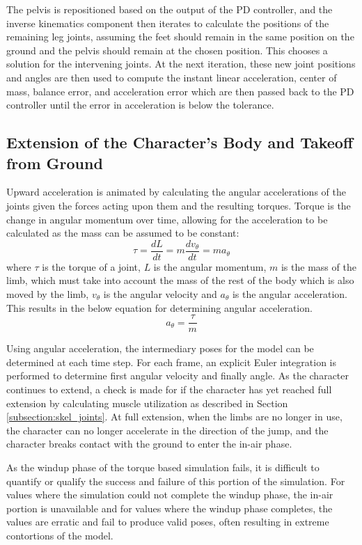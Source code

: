The pelvis is repositioned based on the output of the PD controller, and the inverse kinematics component then iterates to calculate the positions of the remaining leg joints, assuming the feet should remain in the same position on the ground and the pelvis should remain at the chosen position.  This chooses a solution for the intervening joints.  At the next iteration, these new joint positions and angles are then used to compute the instant linear acceleration, center of mass, balance error, and acceleration error which are then passed back to the PD controller until the error in acceleration is below the tolerance.


\subsection{Extension of the Character's Body and Takeoff from Ground}
\label{subsection:thrust}
Upward acceleration is animated by calculating the angular accelerations of the joints given the forces acting upon them and the resulting torques.  Torque is the change in angular momentum over time, allowing for the acceleration to be calculated as the mass can be assumed to be constant: \[\tau = \dfrac{dL}{dt} = m \dfrac{dv_{\theta}}{dt} = m a_{\theta}\] where $\tau$ is the torque of a joint, $L$ is the angular momentum, $m$ is the mass of the limb, which must take into account the mass of the rest of the body which is also moved by the limb, $v_{\theta}$ is the angular velocity and $a_{\theta}$ is the angular acceleration. This results in the below equation for determining angular acceleration. \[a_{\theta} = \dfrac{\tau}{m}\]

Using angular acceleration, the intermediary poses for the model can be determined at each time step.   For each frame, an explicit Euler integration is performed to determine first angular velocity and finally angle.  As the character continues to extend, a check is made for if the character has yet reached full extension by calculating muscle utilization as described in Section \ref{subsection:skel_joints}.  At full extension, when the limbs are no longer in use, the character can no longer accelerate in the direction of the jump, and the character breaks contact with the ground to enter the in-air phase.

As the windup phase of the torque based simulation fails, it is difficult to quantify or qualify the success and failure of this portion of the simulation.  For values where the simulation could not complete the windup phase, the in-air portion is unavailable and for values where the windup phase completes, the values are erratic and fail to produce valid poses, often resulting in extreme contortions of the model.


